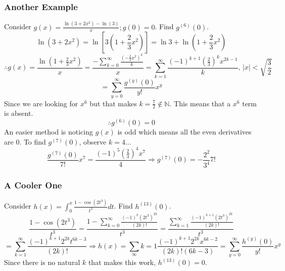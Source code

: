 \documentclass[../main.tex]{subfiles}
\begin{document}
        \subsubsection{Another Example}
            Consider $g(x)=\frac{\ln(3+2x^{2})-\ln(3)}{x};g(0)=0$. Find $g^{(6)}(0)$.
            $$\ln(3+2x^{2})=\ln\left[3(1+\frac{2}{3}x^{2})\right]=\ln{3}+\ln(1+\frac{2}{3}x^{2})$$
            $$\therefore g(x)=\frac{\ln(1+\frac{2}{3}x^{2})}{x}=\frac{-\sum_{k=0}^{\infty}\frac{(-\frac{2}{3}x^{2})^{k}}{k}}{x}=\sum_{k=1}^{\infty}\frac{(-1)^{k+1}(\frac{2}{3})^{k}x^{2k-1}}{k}\text{, }|x|<\sqrt{\frac{3}{2}}$$
            $$=\sum_{y=0}^{\infty}\frac{g^{(y)}(0)}{y!}x^{y}$$
            Since we are looking for $x^{6}$ but that makes $k=\frac{7}{2}\notin\mathbb{N}$. This means that a $x^{6}$ term is absent.
            $$\therefore g^{(6)}(0)=0$$
            An easier method is noticing $g(x)$ is odd which means all the even derivatives are $0$. To find $g^{(7)}(0)$, observe $k=4$...
            $$\frac{g^{(7)}(0)}{7!}x^{7}=\frac{(-1)^{5}\left(\frac{2}{3}\right)^{4}x^{7}}{4}\Rightarrow g^{(7)}(0)=-\frac{2^{2}}{3^{4}}7!$$

        \subsubsection{A Cooler One}
            Consider $h(x)=\int_{0}^{x}\frac{1-\cos(2t^{3})}{t^{3}}dt$. Find $h^{(13)}(0)$.
            $$\frac{1-\cos(2t^{3})}{t^{3}}=\frac{1-\sum_{k=0}^{\infty}\frac{(-1)^{k}(2t^{3})^{2k}}{(2k)!}}{t^{3}}=\frac{\sum_{k=1}^{\infty}\frac{(-1)^{k+1}(2t^{3})^{2k}}{(2k)!}}{t^{3}}$$
            $$=\sum_{k=1}^{\infty}\frac{(-1)^{k+1}2^{2k}t^{6k-3}}{(2k)!}\Rightarrow h(x)=\sum_{\infty}{k=1}\frac{(-1)^{k+1}2^{2k}x^{6k-2}}{(2k)!(6k-3)}=\sum_{y=0}^{\infty}\frac{h^{(y)}(0)}{y!}x^{y}$$
            Since there is no natural $k$ that makes this work, $h^{(13)}(0)=0$.
\end{document}
